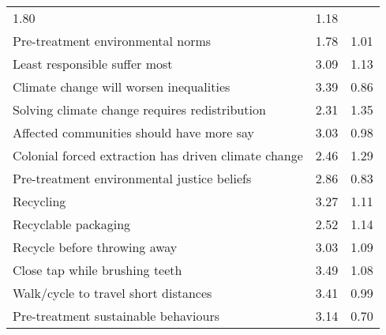 \documentclass{article}
\begin{document}
\begin{table}[!h]
\begin{tabular}{lll}
  \multicolumn{1}{|l}{1.80} &
  \multicolumn{1}{|l|}{1.18} \\
\cline{1-3}
\multicolumn{1}{|l}{Pre-treatment environmental norms} &
  \multicolumn{1}{|l}{1.78} &
  \multicolumn{1}{|l|}{1.01} \\
\cline{1-3}
\multicolumn{1}{|l}{Least responsible suffer most} &
  \multicolumn{1}{|l}{3.09} &
  \multicolumn{1}{|l|}{1.13} \\
\cline{1-3}
\multicolumn{1}{|l}{Climate change will worsen inequalities} &
  \multicolumn{1}{|l}{3.39} &
  \multicolumn{1}{|l|}{0.86} \\
\cline{1-3}
\multicolumn{1}{|l}{Solving climate change requires redistribution} &
  \multicolumn{1}{|l}{2.31} &
  \multicolumn{1}{|l|}{1.35} \\
\cline{1-3}
\multicolumn{1}{|l}{Affected communities should have more say} &
  \multicolumn{1}{|l}{3.03} &
  \multicolumn{1}{|l|}{0.98} \\
\cline{1-3}
\multicolumn{1}{|l}{Colonial forced extraction has driven climate change} &
  \multicolumn{1}{|l}{2.46} &
  \multicolumn{1}{|l|}{1.29} \\
\cline{1-3}
\multicolumn{1}{|l}{Pre-treatment environmental justice beliefs} &
  \multicolumn{1}{|l}{2.86} &
  \multicolumn{1}{|l|}{0.83} \\
\cline{1-3}
\multicolumn{1}{|l}{Recycling} &
  \multicolumn{1}{|l}{3.27} &
  \multicolumn{1}{|l|}{1.11} \\
\cline{1-3}
\multicolumn{1}{|l}{Recyclable packaging} &
  \multicolumn{1}{|l}{2.52} &
  \multicolumn{1}{|l|}{1.14} \\
\cline{1-3}
\multicolumn{1}{|l}{Recycle before throwing away} &
  \multicolumn{1}{|l}{3.03} &
  \multicolumn{1}{|l|}{1.09} \\
\cline{1-3}
\multicolumn{1}{|l}{Close tap while brushing teeth} &
  \multicolumn{1}{|l}{3.49} &
  \multicolumn{1}{|l|}{1.08} \\
\cline{1-3}
\multicolumn{1}{|l}{Walk/cycle to travel short distances} &
  \multicolumn{1}{|l}{3.41} &
  \multicolumn{1}{|l|}{0.99} \\
\cline{1-3}
\multicolumn{1}{|l}{Pre-treatment sustainable behaviours} &
  \multicolumn{1}{|l}{3.14} &
  \multicolumn{1}{|l|}{0.70} \\
\cline{1-3}
\end{tabular}
\end{table}
\end{document}
